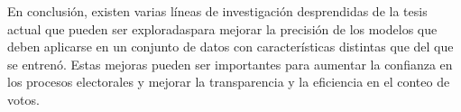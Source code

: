 En conclusión, existen varias líneas de investigación desprendidas de la tesis actual que pueden ser exploradaspara
mejorar la precisión de los modelos que deben aplicarse en un conjunto de datos con características distintas que del
que se entrenó. Estas mejoras pueden ser importantes para aumentar la confianza en los procesos electorales y mejorar
la transparencia y la eficiencia en el conteo de votos.